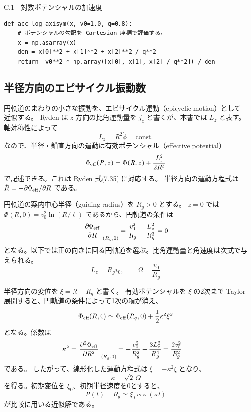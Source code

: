 \begin{listingbox}{C.1　対数ポテンシャルの加速度}
\begin{Verbatim}[fontsize=\small,xleftmargin=1mm]
def acc_log_axisym(x, v0=1.0, q=0.8):
    # ポテンシャルの勾配を Cartesian 座標で評価する。
    x = np.asarray(x)
    den = x[0]**2 + x[1]**2 + x[2]**2 / q**2
    return -v0**2 * np.array([x[0], x[1], x[2] / q**2]) / den
\end{Verbatim}
\end{listingbox}


\subsection{半径方向のエピサイクル振動数}

円軌道のまわりの小さな振動を、エピサイクル運動（epicyclic motion）として近似する。
Ryden は $z$ 方向の比角運動量を $j_z$ と書くが、本書では $L_z$ と表す。
軸対称性によって
\begin{equation}
 L_z=R^2\dot\phi=\mathrm{const.}
\label{eq:appC-jz}
\end{equation}
なので、半径・鉛直方向の運動は有効ポテンシャル（effective potential）
\begin{equation}
 \Phi_{\rm eff}(R,z)=\Phi(R,z)+\frac{L_z^2}{2R^2}
\label{eq:appC-effective-potential}
\end{equation}
で記述できる。これは Ryden 式(7.35) に対応する\cite{ryden2025}。
半径方向の運動方程式は $\ddot R=-\partial\Phi_{\rm eff}/\partial R$ である。

円軌道の案内中心半径（guiding radius）を $R_g>0$ とする。
$z=0$ では $\Phi(R,0)=v_0^2\ln(R/\ell)$ であるから、円軌道の条件は
\begin{equation}
 \left.\frac{\partial\Phi_{\rm eff}}{\partial R}\right|_{(R_g,0)}
 =\frac{v_0^2}{R_g}-\frac{L_z^2}{R_g^3}=0
\end{equation}
となる。以下では正の向きに回る円軌道を選ぶ。比角運動量と角速度は次式で与えられる。
\begin{equation}
 L_z=R_gv_0,\qquad \Omega=\frac{v_0}{R_g}
\label{eq:appC-jz-circular}
\end{equation}

半径方向の変位を $\xi=R-R_g$ と書く。
有効ポテンシャルを $\xi$ の2次まで Taylor 展開すると、円軌道の条件によって1次の項が消え、
\begin{equation}
 \Phi_{\rm eff}(R,0)\simeq\Phi_{\rm eff}(R_g,0)+\frac12\kappa^2\xi^2
\end{equation}
となる。係数は
\begin{align}
 \kappa^2
 &=\left.\frac{\partial^2\Phi_{\rm eff}}{\partial R^2}\right|_{(R_g,0)}
 =-\frac{v_0^2}{R_g^2}+\frac{3L_z^2}{R_g^4}
 =\frac{2v_0^2}{R_g^2}
\end{align}
である。
したがって、線形化した運動方程式は $\ddot\xi=-\kappa^2\xi$ となり、
\begin{equation}
 \boxed{\kappa=\sqrt{2}\,\Omega}
\label{eq:appC-kappa}
\end{equation}
を得る。初期変位を $\xi_0$、初期半径速度を0とすると、
\begin{equation}
 R(t)-R_g\simeq\xi_0\cos(\kappa t)
\label{eq:appC-radial-harmonic}
\end{equation}
が比較に用いる近似解である。


